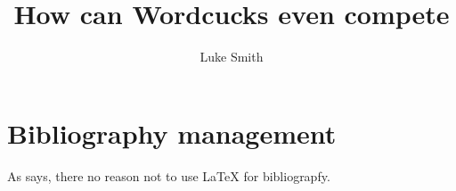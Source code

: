 \documentclass{article}
\author{Luke Smith}
\title{How can Wordcucks even compete}
\begin{document}
\maketitle


\section{Bibliography management}


As \textcite{test} says, there no reason not to use \LaTeX{} for bibliograpfy.






\printbibliography
\end{document}
